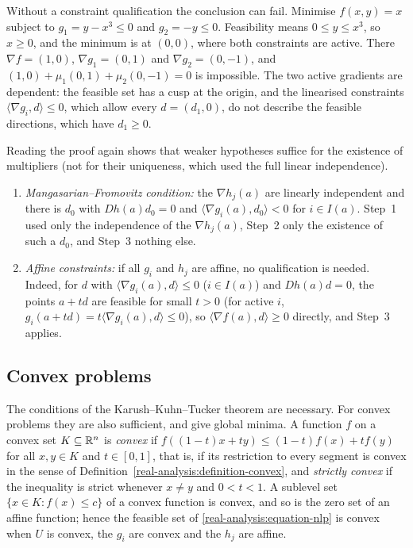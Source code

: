 \begin{counterexample}\label{real-analysis:counterexample-kkt}
Without a constraint qualification the conclusion can fail. Minimise $f(x, y) = x$ subject to $g_1 = y - x^3 \leq 0$ and $g_2 = -y \leq 0$. Feasibility means $0 \leq y \leq x^3$, so $x \geq 0$, and the minimum
is at $(0, 0)$, where both constraints are active. There $\nabla f = (1, 0)$, $\nabla g_1 = (0, 1)$ and $\nabla g_2 = (0, -1)$, and $(1, 0) + \mu_1(0, 1) + \mu_2(0, -1) = 0$ is impossible. The two active
gradients are dependent: the feasible set has a cusp at the origin, and the linearised constraints $\langle\nabla g_i, d\rangle \leq 0$, which allow every $d = (d_1, 0)$, do not describe the feasible
directions, which have $d_1 \geq 0$.
\end{counterexample}

\begin{remark}\label{real-analysis:remark-constraint-qualifications}
Reading the proof again shows that weaker hypotheses suffice for the existence of multipliers (not for their uniqueness, which used the full linear independence).
\begin{enumerate}
\item \emph{Mangasarian--Fromovitz condition:} the $\nabla h_j(a)$ are linearly independent and there is $d_0$ with $Dh(a)d_0 = 0$ and $\langle\nabla g_i(a), d_0\rangle < 0$ for $i \in I(a)$. Step~1
used only the independence of the $\nabla h_j(a)$, Step~2 only the existence of such a $d_0$, and Step~3 nothing else.
\item \emph{Affine constraints:} if all $g_i$ and $h_j$ are affine, no qualification is needed. Indeed, for $d$ with $\langle\nabla g_i(a), d\rangle \leq 0$ ($i \in I(a)$) and $Dh(a)d = 0$, the points
$a + td$ are feasible for small $t > 0$ (for active $i$, $g_i(a + td) = t\langle\nabla g_i(a), d\rangle \leq 0$), so $\langle\nabla f(a), d\rangle \geq 0$ directly, and Step~3 applies.
\end{enumerate}
\end{remark}

\subsection{Convex problems}\label{real-analysis:subsection-convex-problems}

The conditions of the Karush--Kuhn--Tucker theorem are necessary. For convex problems they are also sufficient, and give global minima. A function $f$ on a convex set $K \subseteq \mathbb{R}^n$ is
\emph{convex} if $f((1 - t)x + ty) \leq (1 - t)f(x) + tf(y)$ for all $x, y \in K$ and $t \in [0, 1]$, that is, if its restriction to every segment is convex in the sense of
Definition~\ref{real-analysis:definition-convex}, and \emph{strictly convex} if the inequality is strict whenever $x \neq y$ and $0 < t < 1$. A sublevel set $\{x \in K : f(x) \leq c\}$ of a convex
function is convex, and so is the zero set of an affine function; hence the feasible set of \eqref{real-analysis:equation-nlp} is convex when $U$ is convex, the $g_i$ are convex and the $h_j$ are affine.

